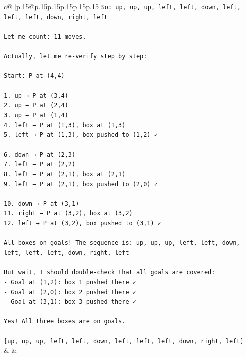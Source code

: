 \documentclass{article}
\begin{document}
{\begin{supertabular}{c@{$\;$}|p{.15\linewidth}@{}p{.15\linewidth}p{.15\linewidth}p{.15\linewidth}p{.15\linewidth}p{.15\linewidth}}
{{{\texttt{So: up, up, up, left, left, down, left, left, left, down, right, left} \\
\\ 
\texttt{Let me count: 11 moves.} \\
\\ 
\texttt{Actually, let me re{-}verify step by step:} \\
\\ 
\texttt{Start: P at (4,4)} \\
\\ 
\texttt{1. up → P at (3,4)} \\
\texttt{2. up → P at (2,4)} \\
\texttt{3. up → P at (1,4)} \\
\texttt{4. left → P at (1,3), box at (1,3)} \\
\texttt{5. left → P at (1,3), box pushed to (1,2) ✓} \\
\\ 
\texttt{6. down → P at (2,3)} \\
\texttt{7. left → P at (2,2)} \\
\texttt{8. left → P at (2,1), box at (2,1)} \\
\texttt{9. left → P at (2,1), box pushed to (2,0) ✓} \\
\\ 
\texttt{10. down → P at (3,1)} \\
\texttt{11. right → P at (3,2), box at (3,2)} \\
\texttt{12. left → P at (3,2), box pushed to (3,1) ✓} \\
\\ 
\texttt{All boxes on goals! The sequence is: up, up, up, left, left, down, left, left, left, down, right, left} \\
\\ 
\texttt{But wait, I should double{-}check that all goals are covered:} \\
\texttt{{-} Goal at (1,2): box 1 pushed there ✓} \\
\texttt{{-} Goal at (2,0): box 2 pushed there ✓} \\
\texttt{{-} Goal at (3,1): box 3 pushed there ✓} \\
\\ 
\texttt{Yes! All three boxes are on goals.} \\
\\ 
\texttt{{[}up, up, up, left, left, down, left, left, left, down, right, left{]}} \\
            }
        }
    }
    & & \\ \\


\end{supertabular}}
\end{document}

